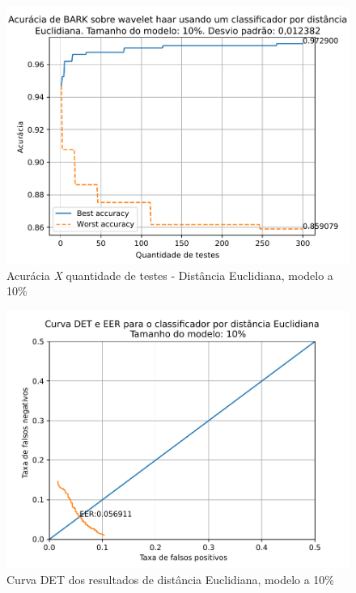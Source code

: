 			\begin{figure}[!h]
				\centering
				\includegraphics[width=\linewidth]{images/results/confusionMatrices/classifier_Euclidian_10}
				\caption{Acurácia \textit{X} quantidade de testes - Distância Euclidiana, modelo a 10\%}
				\label{fig:classifiereuclidian10}
			\end{figure}

			\begin{figure}[!h]
				\centering
				\includegraphics[width=.9\linewidth]{images/results/det/DET_for_classifier_Euclidian_10}
				\caption{Curva DET dos resultados de distância Euclidiana, modelo a 10\%}
				\label{fig:detforclassifiereuclidian10}
			\end{figure}

			\FloatBarrier
					
